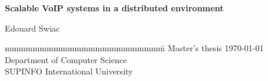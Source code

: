 \documentclass[12pt]{report}
\begin{document}
\begin{titlepage}

\vspace*{5cm}

\noindent
\begin{flushleft}
\setlength{\baselineskip}{2\baselineskip}
{{\Huge \bf Scalable VoIP systems in a distributed environment}}

\end{flushleft}

\newcommand{\TitleStyle}[1]{{\Large \textbf{#1}}}
\newcommand{\TitleSpace}{\vspace{2pt}}
\vspace{2cm}
\noindent
{Edouard Swiac}

\vspace{1cm}
\vspace{\fill}
\vspace{2cm}
\begin{tabbing}
mmmmmmmmmmmmmmmmmmmmmmm\= \kill
\>Master's thesis \today\\
\>Department of Computer Science\\
\>SUPINFO International University\\
\> \\
\end{tabbing}
\end{titlepage}

\thispagestyle{empty}
\newlength{\origpar}
\setlength{\origpar}{\parindent}
\setlength{\parindent}{0pt}

\setlength{\parindent}{\origpar}

\thispagestyle{empty}
\tableofcontents
\clearpage

\renewcommand {\baselinestretch} {1.0}
\pagebreak 
{}




\newpage

%



\end{document}
